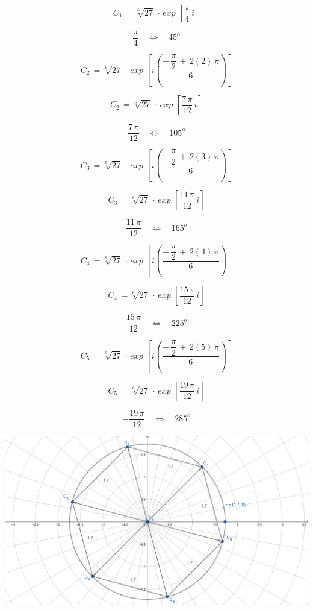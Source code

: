 \documentclass[a4paper,11pt,openany]{book}
\begin{document}
$$C_1\,=\sqrt[6]{27}\,\cdot\,exp\,{\,\left[\dfrac{\pi}{4}\,i\right]}$$

$$\dfrac{\pi}{4} \quad\iff\quad \boxed{45^{o}}$$

\textcolor{ao(english)}{}

$$C_2\,=\sqrt[6]{27}\,\cdot\,exp\,{\,\left[i\left(  \dfrac{-\,\dfrac{\pi}{2}\,+\,2(2)\,\pi}{6}\right)\right]}$$

$$C_2\,=\sqrt[6]{27}\,\cdot\,exp\,{\,\left[\dfrac{7\,\pi}{12}\,i\right]}$$

$$\dfrac{7\,\pi}{12} \quad\iff\quad \boxed{105^{o}}$$

\textcolor{ao(english)}{}

$$C_3\,=\sqrt[6]{27}\,\cdot\,exp\,{\,\left[i\left(  \dfrac{-\,\dfrac{\pi}{2}\,+\,2(3)\,\pi}{6}\right)\right]}$$

$$C_3\,=\sqrt[6]{27}\,\cdot\,exp\,{\,\left[\dfrac{11\,\pi}{12}\,i\right]}$$

$$\dfrac{11\,\pi}{12} \quad\iff\quad \boxed{165^{o}}$$

\textcolor{ao(english)}{}

$$C_4\,=\sqrt[6]{27}\,\cdot\,exp\,{\,\left[i\left(  \dfrac{-\,\dfrac{\pi}{2}\,+\,2(4)\,\pi}{6}\right)\right]}$$

$$C_4\,=\sqrt[6]{27}\,\cdot\,exp\,{\,\left[\dfrac{15\,\pi}{12}\,i\right]}$$

$$\dfrac{15\,\pi}{12} \quad\iff\quad \boxed{225^{o}}$$

\textcolor{ao(english)}{}

$$C_5\,=\sqrt[6]{27}\,\cdot\,exp\,{\,\left[i\left(  \dfrac{-\,\dfrac{\pi}{2}\,+\,2(5)\,\pi}{6}\right)\right]}$$

$$C_5\,=\sqrt[6]{27}\,\cdot\,exp\,{\,\left[\dfrac{19\,\pi}{12}\,i\right]}$$

$$-\dfrac{19\,\pi}{12} \quad\iff\quad \boxed{285^{o}}$$

\includegraphics[width=15cm]{Gra-Ej-10}
\end{document}
